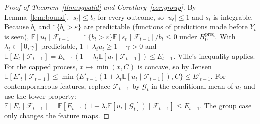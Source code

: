 \documentclass[pdflatex,sn-mathphys-ay]{sn-jnl}%
\theoremstyle{thmstyleone}%
\theoremstyle{thmstyletwo}%
\theoremstyle{thmstylethree}%
\newcommand{\E}{\mathbb{E}}
\newcommand{\F}{\mathcal{F}}
\newcommand{\indic}{\mathbb{1}}
\begin{document}
\begin{appendices}
\begin{proof}[Proof of Theorem~\ref{thm:sgvalid} and Corollary~\ref{cor:group}]
By Lemma~\ref{lem:bound}, $|s_t|\le b_t$ for every outcome, so $|u_t|\le1$ and $s_t$ is integrable. Because $b_t$ and
$\indic\{b_t>\varepsilon\}$ are predictable (functions of predictions made before $Y_t$ is seen),
$\E[u_t\mid\F_{t-1}]=\indic\{b_t>\varepsilon\}\E[s_t\mid\F_{t-1}]/b_t\le0$ under $H_0^{\mathrm{preq}}$.
With $\lambda_t\in[0,\gamma]$ predictable, $1+\lambda_tu_t\ge1-\gamma>0$ and
$\E[E_t\mid\F_{t-1}]=E_{t-1}(1+\lambda_t\E[u_t\mid\F_{t-1}])\le E_{t-1}$. Ville's inequality applies. For the capped
process, $x\mapsto\min(x,C)$ is concave, so by Jensen $\E[E'_t\mid\F_{t-1}]\le\min\{E'_{t-1}(1+\lambda_t\E[u_t\mid\F_{t-1}]),C\}\le E'_{t-1}$.
For contemporaneous features, replace $\F_{t-1}$ by $\mathcal G_t$ in the conditional mean of $u_t$ and use the tower property:
$\E[E_t\mid\F_{t-1}]=\E[E_{t-1}(1+\lambda_t\E[u_t\mid\mathcal G_t])\mid\F_{t-1}]\le E_{t-1}$. The group case only changes the feature maps.
\end{proof}


\end{appendices}
\end{document}
